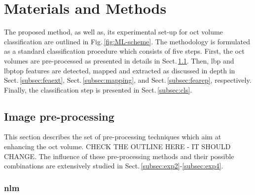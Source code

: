 \graphicspath{ {./content/method/figures/}}

\section{Materials and Methods}\label{sec:method}

The proposed method, as well as, its experimental set-up for \ac{oct} volume classification are outlined in Fig.\,\ref{fig:ML-scheme}.
The methodology is formulated as a standard classification procedure which consists of five steps.
First, the \ac{oct} volumes are pre-processed as presented in details in Sect.\,\ref{subsec:prepro}.
Then, \ac{lbp} and \ac{lbptop} features are detected, mapped and extracted as discussed in depth in Sect.\,\ref{subsec:feaext}, Sect.\,\ref{subsec:mapping}, and Sect.\,\ref{subsec:fearep}, respectively.
Finally, the classification step is presented in Sect.\,\ref{subsec:cls}.


\subsection{Image pre-processing}\label{subsec:prepro}

This section describes the set of pre-processing techniques which aim at enhancing the \ac{oct} volume.
{\color{red} CHECK THE OUTLINE HERE - IT SHOULD CHANGE.}
The influence of these pre-processing methods and their possible combinations are extensively studied in Sect.\,\ref{subsec:exp2}-\ref{subsec:exp4}.

\subsubsection{\acf{nlm}}

